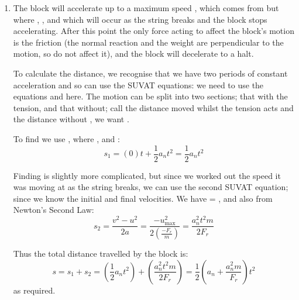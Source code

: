 \begin{problem}[A1987PSIIQ9a]
{\begin{enumerate}
	\item The block will accelerate up to a maximum speed , which comes from  but where , ,  and  which will occur as the string breaks and the block stops accelerating. After this point the only force acting to affect the block's motion is the friction (the normal reaction and the weight are perpendicular to the motion, so do not affect it), and the block will decelerate to a halt.

To calculate the distance, we recognise that we have two periods of constant acceleration and so can use the SUVAT equations: we need to use the equations  and  here. The motion can be split into two sections; that with the tension, and that without; call the distance moved whilst the tension acts  and the distance without , we want .

To find  we use , where ,  and :
\begin{equation*} 
s_{1} = (0)t + \frac{1}{2} a_{n}t^{2} = \frac{1}{2} a_{n}t^{2} 
\end{equation*}

Finding  is slightly more complicated, but since we worked out the speed it was moving at as the string breaks, we can use the second SUVAT equation; since we know the initial and final velocities. We have  = ,  and also  from Newton's Second Law:
\begin{equation*}
 s_{2} = \frac{v^{2} - u^{2}}{2a} = \frac{- u_{\text{max}}^{2}}{2\left( \frac{-F_{r}}{m} \right)} = \frac{a_{n}^{2} t^{2} m}{2 F_{r}} 
 \end{equation*}

Thus the total distance travelled by the block is:
\begin{equation*} 
s = s_{1} + s_{2} = \left( \frac{1}{2}a_{n}t^2 \right) + \left( \frac{a_{n}^{2}t^{2}m}{2F_{r}} \right) = \frac{1}{2} \left(a_{n} + \frac{a_{n}^{2}m}{F_{r}} \right)t^{2}
\end{equation*}
as required.


\end{enumerate}}
\end{problem}
